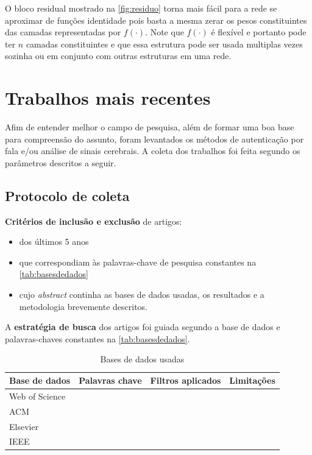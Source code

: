 				\par O bloco residual mostrado na \autoref{fig:residuo} torna mais fácil para a rede se aproximar de funções identidade pois basta a mesma zerar os pesos constituintes das camadas representadas por $f(\cdot)$. Note que $f(\cdot)$ é flexível e portanto pode ter $n$ camadas constituintes e que essa estrutura pode ser usada multiplas vezes sozinha ou em conjunto com outras estruturas em uma rede.

	\section{Trabalhos mais recentes}
		\label{sec:trabalhosMaisRecentes}
	
		\par Afim de entender melhor o campo de pesquisa, além de formar uma boa base para compreensão do assunto, foram levantados os métodos de autenticação por fala e/ou análise de sinais cerebrais. A coleta dos trabalhos foi feita segundo os parâmetros descritos a seguir.
		
		\subsection{Protocolo de coleta}
		
			\par \textbf{Critérios de inclusão e exclusão} de artigos:
			\begin{itemize}
				\item dos últimos 5 anos
				\item que correspondiam às palavras-chave de pesquisa constantes na \autoref{tab:basesdedados}
				\item cujo \textit{abstract} continha as bases de dados usadas, os resultados e a metodologia brevemente descritos.
			\end{itemize}
			
			
			\par A \textbf{estratégia de busca} dos artigos foi guiada segundo a base de dados e palavras-chaves constantes na \autoref{tab:basesdedados}.
			\begin{table}[H]
				\begin{center}
					\caption[Bases de dados usadas]{Bases de dados usadas}
					\begin{tabular}{|l|l|l|l|}
						\hline
						Base de dados & Palavras chave & Filtros aplicados & Limitações \\
						\hline
						Web of Science & & & \\
						\hline
						ACM & & & \\
						\hline
						Elsevier & & & \\
						\hline
						IEEE & & & \\
						\hline
					\end{tabular}
					\label{tab:basesdedados}
				\end{center}
			\end{table}
		
